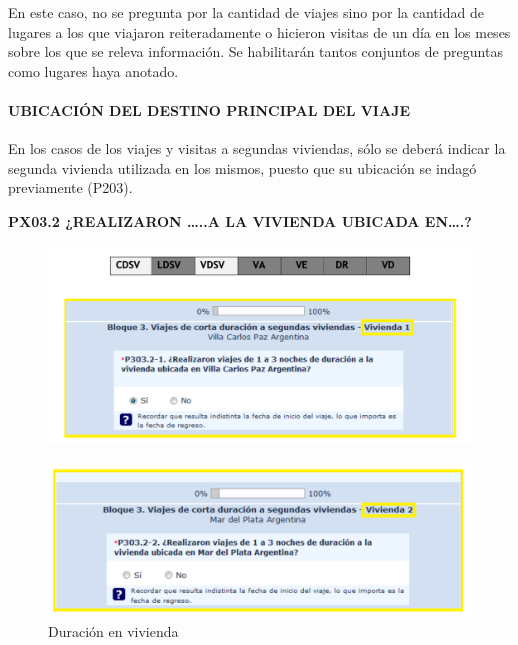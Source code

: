 \documentclass[
  openany]{book}
\begin{document}
En este caso, no se pregunta por la cantidad de viajes sino por la cantidad de lugares a los que viajaron reiteradamente o hicieron visitas de un día en los meses sobre los que se releva información. Se habilitarán tantos conjuntos de preguntas como lugares haya anotado.

\hypertarget{ubicaciuxf3n-del-destino-principal-del-viaje}{%
\paragraph{\texorpdfstring{\textbf{UBICACIÓN DEL DESTINO PRINCIPAL DEL VIAJE}}{UBICACIÓN DEL DESTINO PRINCIPAL DEL VIAJE}}\label{ubicaciuxf3n-del-destino-principal-del-viaje}}

En los casos de los viajes y visitas a segundas viviendas, sólo se deberá indicar la segunda vivienda utilizada en los mismos, puesto que su ubicación se indagó previamente (P203).

\textbf{PX03.2 ¿REALIZARON \ldots..A LA VIVIENDA UBICADA EN\ldots.?}

\begin{figure}

{\centering \includegraphics[width=1\linewidth]{imagenes/figura6-76} 

}

\end{figure}

\begin{figure}

{\centering \includegraphics[width=1\linewidth]{imagenes/figura6-77} 

}

\caption{Duración en vivienda}\label{fig:duracion2}
\end{figure}
\end{document}

